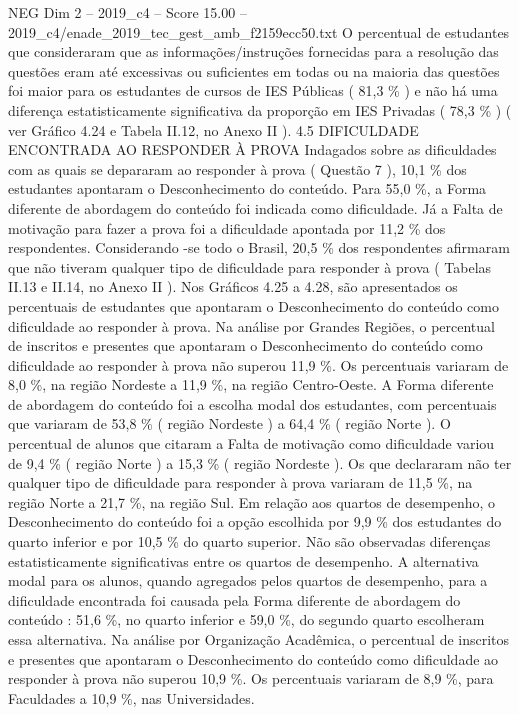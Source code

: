 \begin{textsample}{NEG Dim 2 – 2019\_c4 – Score 15.00 – 2019\_c4/enade\_2019\_tec\_gest\_amb\_f2159ecc50.txt}
O percentual de estudantes que consideraram que as informações/instruções fornecidas para a resolução das questões eram até excessivas ou suficientes em todas ou na maioria das questões foi maior para os estudantes de cursos de IES Públicas ( 81,3 \% ) e não há uma diferença estatisticamente significativa da proporção em IES Privadas ( 78,3 \% ) ( ver Gráfico 4.24 e Tabela II.12, no Anexo II ). 4.5 DIFICULDADE ENCONTRADA AO RESPONDER À PROVA Indagados sobre as dificuldades com as quais se depararam ao responder à prova ( Questão 7 ), 10,1 \% dos estudantes apontaram o Desconhecimento do conteúdo.
Para 55,0 \%, a Forma diferente de abordagem do conteúdo foi indicada como dificuldade.
Já a Falta de motivação para fazer a prova foi a dificuldade apontada por 11,2 \% dos respondentes.
Considerando -se todo o Brasil, 20,5 \% dos respondentes afirmaram que não tiveram qualquer tipo de dificuldade para responder à prova ( Tabelas II.13 e II.14, no Anexo II ).
Nos Gráficos 4.25 a 4.28, são apresentados os percentuais de estudantes que apontaram o Desconhecimento do conteúdo como dificuldade ao responder à prova.
Na análise por Grandes Regiões, o percentual de inscritos e presentes que apontaram o Desconhecimento do conteúdo como dificuldade ao responder à prova não superou 11,9 \%.
Os percentuais variaram de 8,0 \%, na região Nordeste a 11,9 \%, na região Centro-Oeste.
A Forma diferente de abordagem do conteúdo foi a escolha modal dos estudantes, com percentuais que variaram de 53,8 \% ( região Nordeste ) a 64,4 \% ( região Norte ).
O percentual de alunos que citaram a Falta de motivação como dificuldade variou de 9,4 \% ( região Norte ) a 15,3 \% ( região Nordeste ).
Os que declararam não ter qualquer tipo de dificuldade para responder à prova variaram de 11,5 \%, na região Norte a 21,7 \%, na região Sul.
Em relação aos quartos de desempenho, o Desconhecimento do conteúdo foi a opção escolhida por 9,9 \% dos estudantes do quarto inferior e por 10,5 \% do quarto superior.
Não são observadas diferenças estatisticamente significativas entre os quartos de desempenho.
A alternativa modal para os alunos, quando agregados pelos quartos de desempenho, para a dificuldade encontrada foi causada pela Forma diferente de abordagem do conteúdo : 51,6 \%, no quarto inferior e 59,0 \%, do segundo quarto escolheram essa alternativa.
Na análise por Organização Acadêmica, o percentual de inscritos e presentes que apontaram o Desconhecimento do conteúdo como dificuldade ao responder à prova não superou 10,9 \%.
Os percentuais variaram de 8,9 \%, para Faculdades a 10,9 \%, nas Universidades.

\end{textsample}

